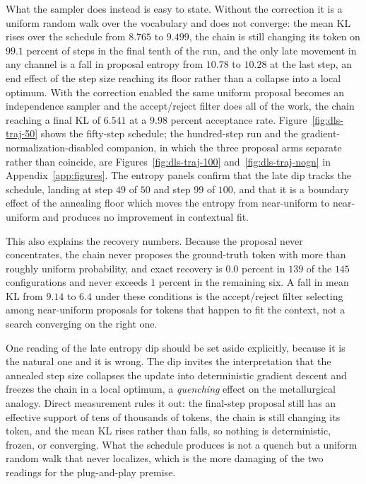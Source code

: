 What the sampler does instead is easy to state. Without the correction it is a uniform random walk over the vocabulary and does not converge: the mean KL rises over the schedule from $8.765$ to $9.499$, the chain is still changing its token on $99.1$ percent of steps in the final tenth of the run, and the only late movement in any channel is a fall in proposal entropy from $10.78$ to $10.28$ at the last step, an end effect of the step size reaching its floor rather than a collapse into a local optimum. With the correction enabled the same uniform proposal becomes an independence sampler and the accept/reject filter does all of the work, the chain reaching a final KL of $6.541$ at a $9.98$ percent acceptance rate.
Figure~\ref{fig:dls-traj-50} shows the fifty-step schedule; the hundred-step run and the gradient-normalization-disabled companion, in which the three proposal arms separate rather than coincide, are Figures~\ref{fig:dls-traj-100} and~\ref{fig:dls-traj-nogn} in Appendix~\ref{app:figures}. The entropy panels confirm that the late dip tracks the schedule, landing at step $49$ of $50$ and step $99$ of $100$, and that it is a boundary effect of the annealing floor which moves the entropy from near-uniform to near-uniform and produces no improvement in contextual fit.

This also explains the recovery numbers. Because the proposal never concentrates, the chain never proposes the ground-truth token with more than roughly uniform probability, and exact recovery is $0.0$ percent in $139$ of the $145$ configurations and never exceeds $1$ percent in the remaining six. A fall in mean KL from $9.14$ to $6.4$ under these conditions is the accept/reject filter selecting among near-uniform proposals for tokens that happen to fit the context, not a search converging on the right one.

One reading of the late entropy dip should be set aside explicitly, because it is the natural one and it is wrong. The dip invites the interpretation that the annealed step size collapses the update into deterministic gradient descent and freezes the chain in a local optimum, a \emph{quenching} effect on the metallurgical analogy. Direct measurement rules it out: the final-step proposal still has an effective support of tens of thousands of tokens, the chain is still changing its token, and the mean KL rises rather than falls, so nothing is deterministic, frozen, or converging. What the schedule produces is not a quench but a uniform random walk that never localizes, which is the more damaging of the two readings for the plug-and-play premise.

